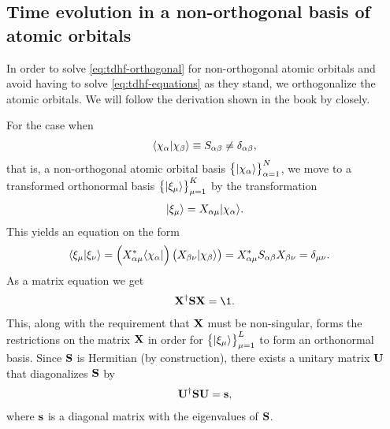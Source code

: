     \subsection{Time evolution in a non-orthogonal basis of atomic orbitals}
        In order to solve \autoref{eq:tdhf-orthogonal} for non-orthogonal
        atomic orbitals and avoid having to solve \autoref{eq:tdhf-equations}
        as they stand, we orthogonalize the atomic orbitals. We will follow the
        derivation shown in the book  by
        \citeauthor{szabo1996modern} \cite{szabo1996modern} closely.

        For the case when
        \begin{align}
            \langle \chi_{\alpha} | \chi_{\beta} \rangle \equiv S_{\alpha\beta}
            \neq \delta_{\alpha\beta},
        \end{align}
        that is, a non-orthogonal atomic orbital basis
        $\left\{ | \chi_{\alpha} \rangle \right\}_{\alpha = 1}^{N}$, we move to a transformed
        orthonormal basis $\left\{ | \xi_{\mu} \rangle \right\}_{\mu = 1}^{K}$ by the
        transformation
        \begin{align}
            | \xi_{\mu} \rangle = X_{\alpha\mu}| \chi_{\alpha} \rangle.
        \end{align}
        This yields an equation on the form
        \begin{align}
            \langle \xi_{\mu} | \xi_{\nu} \rangle
            &= \left( 
                X_{\alpha\mu}^{*}\langle \chi_{\alpha} |
             \right)\left( 
                X_{\beta\nu}| \chi_{\beta} \rangle
             \right)
            = X_{\alpha\mu}^{*}S_{\alpha\beta}X_{\beta\nu}
            = \delta_{\mu\nu}.
        \end{align}
        As a matrix equation we get
        \begin{align}
            \vf{X}^{\dagger}\vf{S}\vf{X} = \1.
            \label{eq:orthonormal-transformation}
        \end{align}
        This, along with the requirement that $\mathbf{X}$ must be non-singular,
        forms the restrictions on the matrix $\mathbf{X}$ in order for
        $\left\{ | \xi_{\mu} \rangle \right\}_{\mu = 1}^{L}$ to form an orthonormal basis.
        Since $\mathbf{S}$ is Hermitian (by construction), there exists a unitary
        matrix $\mathbf{U}$ that diagonalizes $\mathbf{S}$ by
        \begin{align}
            \mathbf{U}^{\dagger}\mathbf{S}\mathbf{U} = \mathbf{s},
        \end{align}
        where $\mathbf{s}$ is a diagonal matrix with the eigenvalues of $\mathbf{S}$.
